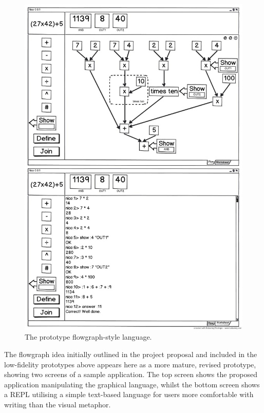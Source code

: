 \documentclass[12pt,twoside,notitlepage,xetex]{report}
\begin{document}
\begin{figure}[H]
\begin{center}
\includegraphics[width=\textwidth-4cm]{figs/mockups/flowgraph/img/fg-000.jpg}
\caption{The prototype flowgraph-style language.}
\label{fig:ProtoFlow}
\end{center}
\end{figure}

The flowgraph idea initially outlined in the project proposal and included in
the low-fidelity prototypes above appears here as a more mature, revised
prototype, showing two screens of a sample application.  The top screen shows
the proposed application manipulating the graphical language, whilst the bottom
screen shows a REPL utilising a simple text-based language for users more
comfortable with writing than the visual metaphor.
\end{document}
